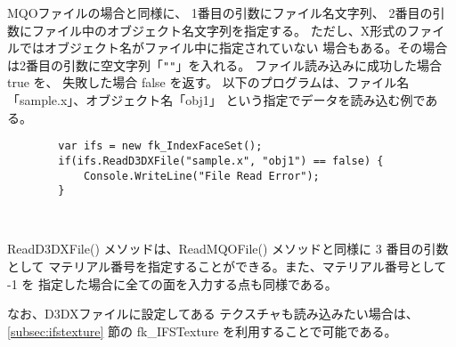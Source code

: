 MQOファイルの場合と同様に、
1番目の引数にファイル名文字列、
2番目の引数にファイル中のオブジェクト名文字列を指定する。
ただし、X形式のファイルではオブジェクト名がファイル中に指定されていない
場合もある。その場合は2番目の引数に空文字列「\verb+""+」を入れる。
ファイル読み込みに成功した場合 true を、
失敗した場合 false を返す。
以下のプログラムは、ファイル名「sample.x」、オブジェクト名「obj1」
という指定でデータを読み込む例である。
\\
\begin{screen}
\begin{verbatim}
        var ifs = new fk_IndexFaceSet();
        if(ifs.ReadD3DXFile("sample.x", "obj1") == false) {
            Console.WriteLine("File Read Error");
        }
\end{verbatim}
\end{screen} ~

ReadD3DXFile() メソッドは、ReadMQOFile() メソッドと同様に 3 番目の引数として
マテリアル番号を指定することができる。また、マテリアル番号として -1 を
指定した場合に全ての面を入力する点も同様である。

なお、D3DXファイルに設定してある
テクスチャも読み込みたい場合は、\ref{subsec:ifstexture} 節の
fk\_IFSTexture を利用することで可能である。

